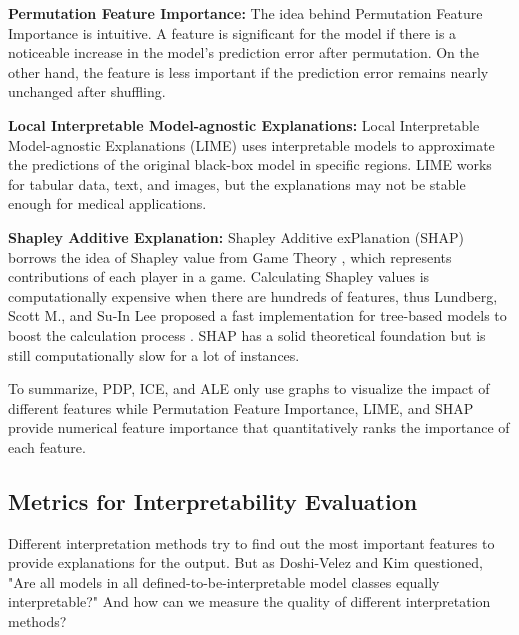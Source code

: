 
\textbf{Permutation Feature Importance: } The idea behind Permutation Feature Importance is intuitive. A feature is significant for the model if there is a noticeable increase in the model's prediction error after permutation. On the other hand, the feature is less important if the prediction error remains nearly unchanged after shuffling.

\textbf{Local Interpretable Model-agnostic Explanations:} Local Interpretable Model-agnostic Explanations (LIME) uses interpretable models to approximate the predictions of the original black-box model in specific regions. LIME works for tabular data, text, and images, but the explanations may not be stable enough for medical applications.

\textbf{Shapley Additive Explanation: } Shapley Additive exPlanation (SHAP) borrows the idea of Shapley value from Game Theory \cite{shapley_1953}, which represents contributions of each player in a game. Calculating Shapley values is computationally expensive when there are hundreds of features, thus Lundberg, Scott M., and Su-In Lee proposed a fast implementation for tree-based models to boost the calculation process \cite{lundberg2017unified}. SHAP has a solid theoretical foundation but is still computationally slow for a lot of instances.

To summarize, PDP, ICE, and ALE only use graphs to visualize the impact of different features while Permutation Feature Importance, LIME, and SHAP provide numerical feature importance that quantitatively ranks the importance of each feature.


\subsection{\textbf{Metrics for Interpretability Evaluation}}

Different interpretation methods try to find out the most important features to provide explanations for the output. But as Doshi-Velez and Kim questioned, "Are all models in all defined-to-be-interpretable model classes equally interpretable?"  \cite{doshivelez2017rigorous} And how can we measure the quality of different interpretation methods? 

